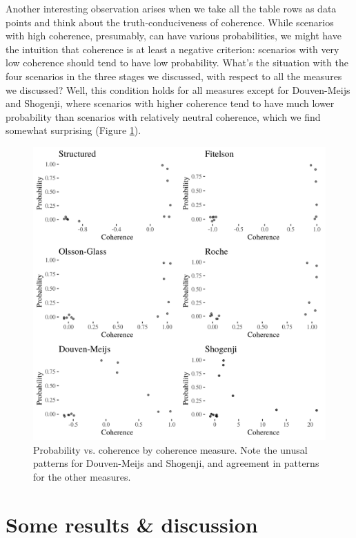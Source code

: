 \documentclass[10pt,]{scrartcl}
\begin{document}
Another interesting observation arises when we take all the table rows as data points and think about the truth-conduciveness of coherence. While scenarios with high coherence, presumably, can have various probabilities, we might have the intuition that coherence is at least a negative criterion: scenarios with very low coherence should tend to have low probability. What's the situation with the four scenarios in the three stages we discussed, with respect to all the measures we discussed? Well, this condition holds for all measures except for Douven-Meijs and Shogenji, where scenarios with higher coherence tend to have much lower probability than scenarios with relatively neutral coherence, which we find somewhat surprising (Figure \ref{fig:cohplot}).



\begin{figure}[H]
    \includegraphics{cohPlots.png}
    \caption{Probability vs. coherence by coherence measure. Note the unusal patterns for Douven-Meijs and Shogenji, and agreement in patterns for the other measures.}
    \label{fig:cohplot}
\end{figure}





\section{Some results \& discussion}
\end{document}
